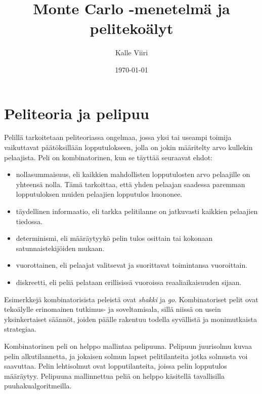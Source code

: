 \documentclass[12pt,finnish]{tktltiki2}
\title{Monte Carlo -menetelmä ja pelitekoälyt}
\author{Kalle Viiri}
\date{\today}
\theoremstyle{definition}
\theoremstyle{remark}
\begin{document}

\frontmatter      %

\maketitle        %
\makeabstract     %

\tableofcontents  %


\mainmatter       %

\section{Peliteoria ja pelipuu}

Pelillä tarkoitetaan peliteoriassa ongelmaa, jossa yksi tai useampi toimija vaikuttavat päätöksillään lopputulokseen, jolla on jokin määritelty arvo kullekin pelaajista. Peli on kombinatorinen, kun se täyttää seuraavat ehdot:~\citep{browne}

\begin{itemize}
	\item nollasummaisuus, eli kaikkien mahdollisten lopputulosten arvo pelaajille on yhteensä nolla. Tämä tarkoittaa, että yhden pelaajan saadessa paremman lopputuloksen muiden pelaajien lopputulos huononee.
	 \item täydellinen informaatio, eli tarkka pelitilanne on jatkuvasti kaikkien pelaajien tiedossa.
	 \item determinismi, eli määräytyykö pelin tulos osittain tai kokonaan satunnaistekijöiden mukaan.
	 \item vuorottainen, eli pelaajat valitsevat ja suorittavat toimintansa vuoroittain.
	 \item diskreetti, eli peliä pelataan erillisissä vuoroissa reaaliaikaisuuden sijaan.
\end{itemize}

Esimerkkejä kombinatorisista peleistä ovat \textit{shakki} ja \textit{go}. Kombinatoriset pelit ovat tekoälylle erinomainen tutkimus- ja soveltamisala, sillä niissä on usein yksinkertaiset säännöt, joiden päälle rakentuu todella syvällistä ja monimutkaista strategiaa.~\cite{browne}

Kombinatorinen peli on helppo mallintaa pelipuuna. Pelipuun juurisolmu kuvaa pelin alkutilannetta, ja jokaisen solmun lapset pelitilanteita jotka solmusta voi saavuttaa. Pelin lehtisolmut ovat lopputilanteita, joissa pelin lopputulos määräytyy. Pelipuuna mallinnettua peliä on helppo käsitellä tavallisilla puuhakualgoritmeilla.~\cite{aima}
\end{document}
